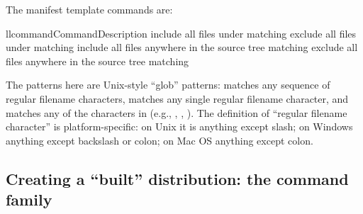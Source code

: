 \documentclass{howto}
\begin{document}
The manifest template commands are:
\begin{tableii}{ll}{command}{Command}{Description}
    {include all files under  matching }
    {exclude all files under  matching }
    {include all files anywhere in the source tree matching }
    {exclude all files anywhere in the source tree matching }
\end{tableii}
The patterns here are Unix-style ``glob'' patterns: \code{*} matches any
sequence of regular filename characters,  matches any single
regular filename character, and  matches any of the
characters in  (e.g., , ,
).  The definition of ``regular filename character'' is
platform-specific: on Unix it is anything except slash; on Windows
anything except backslash or colon; on Mac OS anything except colon.


\subsection{Creating a ``built'' distribution: the
  \protect{} command family}
\label{sec:bdist-cmds}


\subsubsection{\protect{}}

\subsubsection{\protect{}}

\subsubsection{\protect{}}

\subsubsection{\protect{}}
\end{document}
